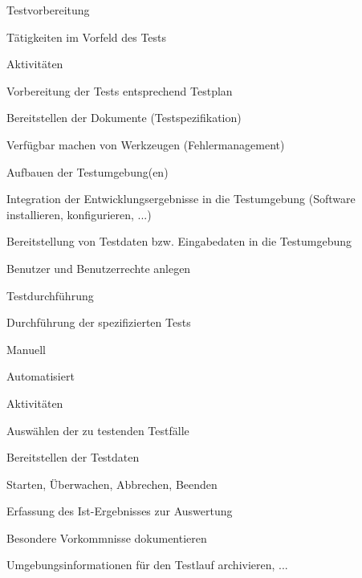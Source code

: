\documentclass[a4paper]{article}
\begin{document}
\begin{multicols}{3}
  Testvorbereitung
  \begin{itemize*}
    \item Tätigkeiten im Vorfeld des Tests
    \item Aktivitäten
    \begin{itemize*}
      \item Vorbereitung der Tests entsprechend Testplan
      \item Bereitstellen der Dokumente (Testspezifikation)
      \item Verfügbar machen von Werkzeugen (Fehlermanagement)
      \item Aufbauen der Testumgebung(en)
      \item Integration der Entwicklungsergebnisse in die Testumgebung (Software installieren, konfigurieren, ...)
      \item Bereitstellung von Testdaten bzw. Eingabedaten in die Testumgebung
      \item Benutzer und Benutzerrechte anlegen
    \end{itemize*}
  \end{itemize*}

  Testdurchführung
  \begin{itemize*}
    \item Durchführung der spezifizierten Tests
    \begin{itemize*}
      \item Manuell
      \item Automatisiert
    \end{itemize*}
    \item Aktivitäten
    \begin{itemize*}
      \item Auswählen der zu testenden Testfälle
      \item Bereitstellen der Testdaten
      \item Starten, Überwachen, Abbrechen, Beenden
      \item Erfassung des Ist-Ergebnisses zur Auswertung
      \item Besondere Vorkommnisse dokumentieren
      \item Umgebungsinformationen für den Testlauf archivieren, ...
    \end{itemize*}
  \end{itemize*}


\end{multicols}
\end{document}
